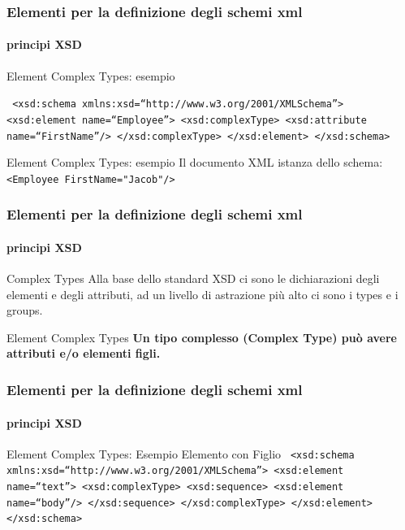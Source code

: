 \begin{frame}
	\frametitle{Elementi per la definizione degli schemi xml}
	\framesubtitle{principi XSD}
	\addtocounter{nframe}{1}

	\begin{block}{Element Complex Types: esempio}

		\texttt{
			<xsd:schema xmlns:xsd=``http://www.w3.org/2001/XMLSchema''>
			<xsd:element name=``Employee''>
			<xsd:complexType>
			<xsd:attribute name=``FirstName''/>
			</xsd:complexType>
			</xsd:element>
			</xsd:schema>
		}
	\end{block}

	\begin{block}{Element Complex Types: esempio}
		Il documento XML istanza dello schema:
		\\\texttt{<Employee FirstName="Jacob"/>}
	\end{block}

\end{frame}

\begin{frame}
	\frametitle{Elementi per la definizione degli schemi xml}
	\framesubtitle{principi XSD}
	\addtocounter{nframe}{1}

	\begin{block}{Complex Types}
		Alla base dello standard XSD ci sono le dichiarazioni degli elementi e degli attributi, ad un livello di astrazione più alto ci sono i types e i groups.

	\end{block}

	\begin{block}{Element Complex Types}
		\textbf{Un tipo complesso (Complex Type) può avere attributi e/o elementi figli.}
	\end{block}

\end{frame}

\begin{frame}
	\frametitle{Elementi per la definizione degli schemi xml}
	\framesubtitle{principi XSD}
	\addtocounter{nframe}{1}

	\begin{block}{Element Complex Types: Esempio Elemento con Figlio}
		\texttt{
			<xsd:schema xmlns:xsd=``http://www.w3.org/2001/XMLSchema''>
			<xsd:element name=``text''>
			<xsd:complexType>
			<xsd:sequence>
			<xsd:element name=``body''/>
			</xsd:sequence>
			</xsd:complexType>
			</xsd:element>
			</xsd:schema>}
	\end{block}

\end{frame}


